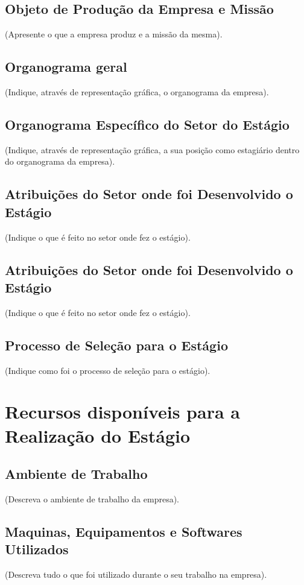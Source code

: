 \documentclass[
	12pt,				%
	openright,			%
	oneside,			%
	a4paper,			%
	english,			%
	french,				%
	spanish,			%
	brazil				%
	]{abntex2}
\begin{document}
\section{Objeto de Produção da Empresa e Missão}
(Apresente o que a empresa produz e a missão da mesma).

\section{Organograma geral}
(Indique, através de representação gráfica, o organograma da empresa).

\section{Organograma Específico do Setor do Estágio}
(Indique, através de representação gráfica, a sua posição como estagiário dentro do
organograma da empresa).

\section{Atribuições do Setor onde foi Desenvolvido o Estágio}
(Indique o que é feito no setor onde fez o estágio).

\section{Atribuições do Setor onde foi Desenvolvido o Estágio}
(Indique o que é feito no setor onde fez o estágio).

\section{Processo de Seleção para o Estágio}
(Indique como foi o processo de seleção para o estágio).

\chapter{Recursos disponíveis para a Realização do Estágio}

\section{Ambiente de Trabalho}
(Descreva o ambiente de trabalho da empresa).

\section{Maquinas, Equipamentos e Softwares Utilizados}
(Descreva tudo o que foi utilizado durante o seu trabalho na empresa).
\end{document}
